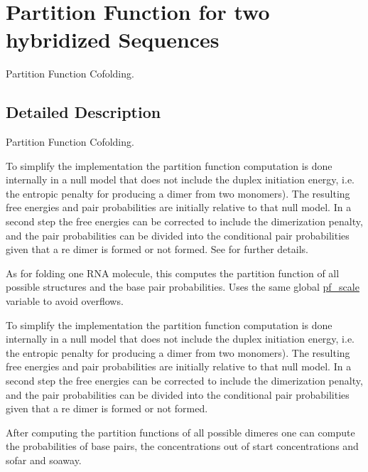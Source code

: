 \hypertarget{group__pf__cofold}{}\section{Partition Function for two hybridized Sequences}
\label{group__pf__cofold}


Partition Function Cofolding.  




\subsection{Detailed Description}
Partition Function Cofolding. 

To simplify the implementation the partition function computation is done internally in a null model that does not include the duplex initiation energy, i.\+e. the entropic penalty for producing a dimer from two monomers). The resulting free energies and pair probabilities are initially relative to that null model. In a second step the free energies can be corrected to include the dimerization penalty, and the pair probabilities can be divided into the conditional pair probabilities given that a re dimer is formed or not formed. See \cite{bernhart:2006} for further details.

As for folding one R\+NA molecule, this computes the partition function of all possible structures and the base pair probabilities. Uses the same global \hyperlink{group__model__details_gad3b22044065acc6dee0af68931b52cfd}{pf\+\_\+scale} variable to avoid overflows.

To simplify the implementation the partition function computation is done internally in a null model that does not include the duplex initiation energy, i.\+e. the entropic penalty for producing a dimer from two monomers). The resulting free energies and pair probabilities are initially relative to that null model. In a second step the free energies can be corrected to include the dimerization penalty, and the pair probabilities can be divided into the conditional pair probabilities given that a re dimer is formed or not formed.

After computing the partition functions of all possible dimeres one can compute the probabilities of base pairs, the concentrations out of start concentrations and sofar and soaway.

